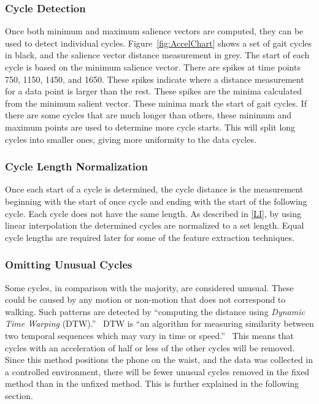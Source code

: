 \documentclass{sig-alternate}
\begin{document}
\subsubsection{Cycle Detection}
	Once both minimum and maximum salience vectors are computed, they can be used to detect individual cycles. Figure~\ref{fig:AccelChart} shows a set of gait cycles in black, and the salience vector distance measurement in grey. The start of each cycle is based on the minimum salience vector. There are spikes at time points 750, 1150, 1450, and 1650. These spikes indicate where a distance measurement for a data point is larger than the rest. These spikes are the minima calculated from the minimum salient vector. These minima mark the start of gait cycles. If there are some cycles that are much longer than others, these minimum and maximum points are used to determine more cycle starts. This will split long cycles into smaller ones, giving more uniformity to the data cycles.

\begin{figure*}
\centering
{}
\caption{Minimum Salient Vectors}
\label{fig:AccelChart}
\end{figure*}

			
\subsubsection{Cycle Length Normalization}
Once each start of a cycle is determined, the cycle distance is the measurement beginning with the start of once cycle and ending with the start of the following cycle. Each cycle does not have the same length. As described in \ref{LI}, by using linear interpolation the determined cycles are normalized to a set length. Equal cycle lengths are required later for some of the feature extraction techniques. 
			
\subsubsection{Omitting Unusual Cycles}
Some cycles, in comparison with the majority, are considered unusual. These could be caused by any motion or non-motion that does not correspond to walking. Such patterns are detected by ``computing the distance using \textit{Dynamic Time Warping} (DTW).''~\cite{Muaaz:2013} DTW is ``an algorithm for measuring similarity between two temporal sequences which may vary in time or speed.''~\cite{wiki2:2014} This means that cycles with an acceleration of half or less of the other cycles will be removed. Since this method positions the phone on the waist, and the data was collected in a controlled environment, there will be fewer unusual cycles removed in the fixed method than in the unfixed method. This is further explained in the following section.
\end{document}
